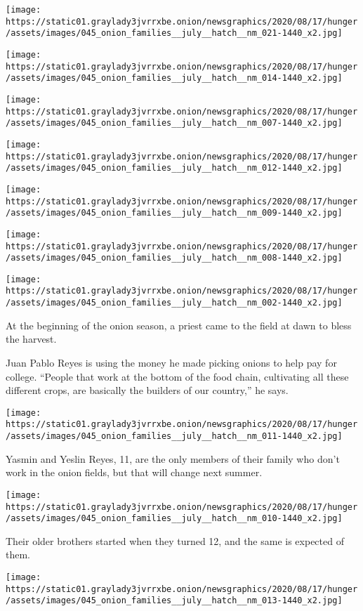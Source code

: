 \texttt{[image: https://static01.graylady3jvrrxbe.onion/newsgraphics/2020/08/17/hunger/assets/images/045\_onion\_families\_\_july\_\_hatch\_\_nm\_021-1440\_x2.jpg]}

\texttt{[image: https://static01.graylady3jvrrxbe.onion/newsgraphics/2020/08/17/hunger/assets/images/045\_onion\_families\_\_july\_\_hatch\_\_nm\_014-1440\_x2.jpg]}

\texttt{[image: https://static01.graylady3jvrrxbe.onion/newsgraphics/2020/08/17/hunger/assets/images/045\_onion\_families\_\_july\_\_hatch\_\_nm\_007-1440\_x2.jpg]}

\texttt{[image: https://static01.graylady3jvrrxbe.onion/newsgraphics/2020/08/17/hunger/assets/images/045\_onion\_families\_\_july\_\_hatch\_\_nm\_012-1440\_x2.jpg]}

\texttt{[image: https://static01.graylady3jvrrxbe.onion/newsgraphics/2020/08/17/hunger/assets/images/045\_onion\_families\_\_july\_\_hatch\_\_nm\_009-1440\_x2.jpg]}

\texttt{[image: https://static01.graylady3jvrrxbe.onion/newsgraphics/2020/08/17/hunger/assets/images/045\_onion\_families\_\_july\_\_hatch\_\_nm\_008-1440\_x2.jpg]}

\texttt{[image: https://static01.graylady3jvrrxbe.onion/newsgraphics/2020/08/17/hunger/assets/images/045\_onion\_families\_\_july\_\_hatch\_\_nm\_002-1440\_x2.jpg]}

At the beginning of the onion season, a priest came to the field at dawn
to bless the harvest.

Juan Pablo Reyes is using the money he made picking onions to help pay
for college. ``People that work at the bottom of the food chain,
cultivating all these different crops, are basically the builders of our
country,'' he says.

\texttt{[image: https://static01.graylady3jvrrxbe.onion/newsgraphics/2020/08/17/hunger/assets/images/045\_onion\_families\_\_july\_\_hatch\_\_nm\_011-1440\_x2.jpg]}

Yasmin and Yeslin Reyes, 11, are the only members of their family who
don't work in the onion fields, but that will change next summer.

\texttt{[image: https://static01.graylady3jvrrxbe.onion/newsgraphics/2020/08/17/hunger/assets/images/045\_onion\_families\_\_july\_\_hatch\_\_nm\_010-1440\_x2.jpg]}

Their older brothers started when they turned 12, and the same is
expected of them.

\texttt{[image: https://static01.graylady3jvrrxbe.onion/newsgraphics/2020/08/17/hunger/assets/images/045\_onion\_families\_\_july\_\_hatch\_\_nm\_013-1440\_x2.jpg]}

